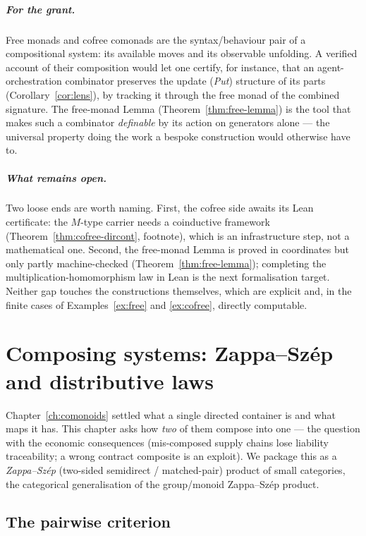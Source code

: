\documentclass[11pt,a4paper]{book}
\theoremstyle{plain}
\theoremstyle{definition}
\theoremstyle{remark}
\begin{document}
\paragraph{For the grant.} Free monads and cofree comonads are the syntax/behaviour pair of a
compositional system: its available moves and its observable unfolding. A verified account of
their composition would let one certify, for instance, that an agent-orchestration combinator
preserves the update (\emph{Put}) structure of its parts (Corollary~\ref{cor:lens}), by
tracking it through the free monad of the combined signature. The free-monad Lemma
(Theorem~\ref{thm:free-lemma}) is the tool that makes such a combinator \emph{definable} by its
action on generators alone --- the universal property doing the work a bespoke construction
would otherwise have to.

\paragraph{What remains open.} Two loose ends are worth naming. First, the cofree side awaits
its Lean certificate: the $M$-type carrier needs a coinductive framework
(Theorem~\ref{thm:cofree-dircont}, footnote), which is an infrastructure step, not a
mathematical one. Second, the free-monad Lemma is proved in coordinates but only partly
machine-checked (Theorem~\ref{thm:free-lemma}); completing the multiplication-homomorphism law
in Lean is the next formalisation target. Neither gap touches the constructions themselves,
which are explicit and, in the finite cases of Examples~\ref{ex:free} and \ref{ex:cofree},
directly computable.

\chapter{Composing systems: Zappa--Sz\'ep and distributive laws}
\label{ch:zs}

Chapter~\ref{ch:comonoids} settled what a single directed container is and what
maps it has. This chapter asks how \emph{two} of them compose into one --- the
question with the economic consequences (mis-composed supply chains lose liability
traceability; a wrong contract composite is an exploit). We package this as a
\emph{Zappa--Sz\'ep} (two-sided semidirect / matched-pair) product of small
categories, the categorical generalisation of the group/monoid Zappa--Sz\'ep
product.

\section{The pairwise criterion}
\label{sec:zscriterion}
\end{document}
